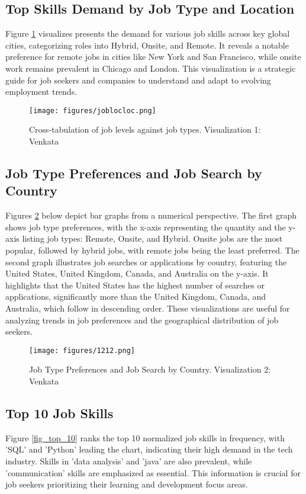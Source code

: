 \documentclass[a4paper,10pt]{article}
\begin{document}
\subsection{Top Skills Demand by Job Type and Location}
Figure \ref{fig_venkata1} visualizes presents the demand for various job skills across key global cities, categorizing roles into Hybrid, Onsite, and Remote. It reveals a notable preference for remote jobs in cities like New York and San Francisco, while onsite work remains prevalent in Chicago and London.
This visualization is a strategic guide for job seekers and companies to understand and adapt to evolving employment trends.

    \begin{figure}[ht]
    \centering
    \texttt{[image: figures/joblocloc.png]}
    \caption{Cross-tabulation of job levels against job types. Visualization 1: Venkata}
    \label{fig_venkata1}
    \end{figure}

\subsection{Job Type Preferences and Job Search by Country}
Figures \ref{fig_venkata2} below depict bar graphs from a numerical perspective. The first graph shows job type preferences, with the x-axis representing the quantity and the y-axis listing job types: Remote, Onsite, and Hybrid. Onsite jobs are the most popular, followed by hybrid jobs, with remote jobs being the least preferred. The second graph illustrates job searches or applications by country, featuring the United States, United Kingdom, Canada, and Australia on the y-axis. It highlights that the United States has the highest number of searches or applications, significantly more than the United Kingdom, Canada, and Australia, which follow in descending order. These visualizations are useful for analyzing trends in job preferences and the geographical distribution of job seekers.

    \begin{figure}[ht]
    \centering
    \texttt{[image: figures/1212.png]}
    \caption{Job Type Preferences and Job Search by Country. Visualization 2: Venkata}
    \label{fig_venkata2}
    \end{figure}

\subsection{Top 10 Job Skills}
Figure \ref{fig_top_10} ranks the top 10 normalized job skills in frequency, with 'SQL' and 'Python' leading the chart, indicating their high demand in the tech industry. Skills in 'data analysis' and 'java' are also prevalent, while 'communication' skills are emphasized as essential. This information is crucial for job seekers prioritizing their learning and development focus areas.
\end{document}
